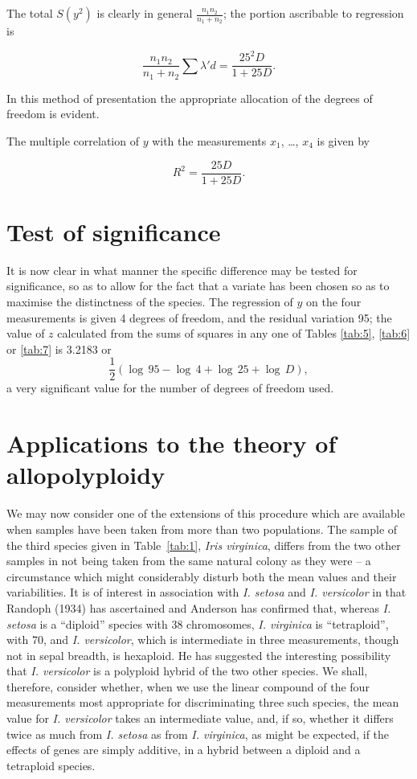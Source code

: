 \documentclass[12pt]{article}
\begin{document}
The total $S (y^2)$ is clearly in general \(\frac{n_{1}n_{2}}{n_{1}+n_{2}}\); the portion ascribable to regression is

\[
\frac{n_{1}n_{2}}{n_{1}+n_{2}}\sum\lambda' d=\frac{25^{2}D}{1+25D}.
\]

In this method of presentation the appropriate allocation of the degrees of freedom is evident.

The multiple correlation of \(y\) with the measurements \(x_{1}\), \ldots, \(x_{4}\) is given by

\[
R^{2}=\frac{25D}{1+25D}.
\]

\section{Test of significance}

It is now clear in what manner the specific difference may be tested for significance, so as to allow for the fact that a variate has been chosen so as to maximise the distinctness of the species. The regression of \(y\) on the four measurements is given 4 degrees of freedom, and the residual variation 95; the value of $z$ calculated from the sums of squares in any one of Tables \ref{tab:5}, \ref{tab:6} or \ref{tab:7} is 3.2183 or
\[
\frac{1}{2} (\log\,95-\log\,4+\log\,25+\log\,D),
\]
a very significant value for the number of degrees of freedom used.

\section{Applications to the theory of allopolyploidy}

We may now consider one of the extensions of this procedure which are available when samples have been taken from more than two populations. The sample of the third species given in Table~\ref{tab:1}, \textit{Iris virginica}, differs from the two other samples in not being taken from the same natural colony as they were -- a circumstance which might considerably disturb both the mean values and their variabilities. It is of interest in association with \textit{I. setosa} and \textit{I. versicolor} in that Randoph (1934) has ascertained and Anderson has confirmed that, whereas \textit{I. setosa} is a ``diploid'' species with 38 chromosomes, \textit{I. virginica} is ``tetraploid'', with 70, and \textit{I. versicolor}, which is intermediate in three measurements, though not in sepal breadth, is hexaploid. He has suggested the interesting possibility that \textit{I. versicolor} is a polyploid hybrid of the two other species. We shall, therefore, consider whether, when we use the linear compound of the four measurements most appropriate for discriminating three such species, the mean value for \textit{I. versicolor} takes an intermediate value, and, if so, whether it differs twice as much from \textit{I. setosa} as from \textit{I. virginica}, as might be expected, if the effects of genes are simply additive, in a hybrid between a diploid and a tetraploid species.
\end{document}
